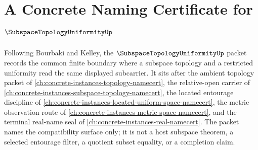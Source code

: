 \chapter{A Concrete Naming Certificate for $\SubspaceTopologyUniformityUp$}
\label{ch:concrete-instances-subspace-topology-uniformity-namecert}

Following Bourbaki and Kelley, the $\SubspaceTopologyUniformityUp$ packet records the common finite boundary where a subspace topology and a restricted uniformity read the same displayed subcarrier. It sits after the ambient topology packet of \autoref{ch:concrete-instances-topology-namecert}, the relative-open carrier of \autoref{ch:concrete-instances-subspace-topology-namecert}, the located entourage discipline of \autoref{ch:concrete-instances-located-uniform-space-namecert}, the metric observation route of \autoref{ch:concrete-instances-metric-space-namecert}, and the terminal real-name seal of \autoref{ch:concrete-instances-real-namecert}. The packet names the compatibility surface only; it is not a host subspace theorem, a selected entourage filter, a quotient subset equality, or a completion claim.

